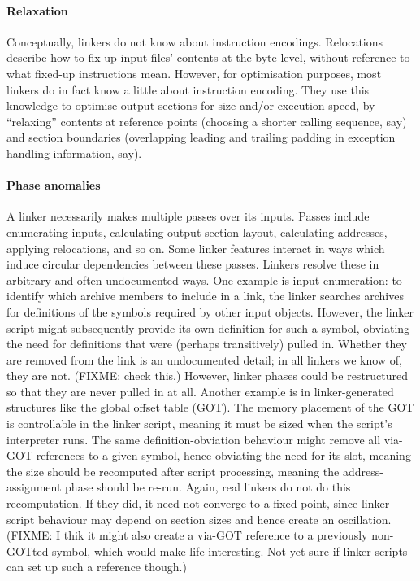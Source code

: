 \paragraph{Relaxation}
Conceptually, linkers do not know about instruction encodings.
Relocations describe how to fix up input files' contents at the byte level,
without reference to what fixed-up instructions mean.
However, for optimisation purposes, most linkers do in fact
know a little about instruction encoding.
They use this knowledge to optimise output sections
for size and/or execution speed, by ``relaxing'' contents
at reference points (choosing a shorter calling sequence, say) 
and section boundaries (overlapping leading and trailing padding in exception
handling information, say).

\paragraph{Phase anomalies} 
A linker necessarily makes multiple passes over its inputs.
Passes include enumerating inputs, calculating output section layout, 
calculating addresses, applying relocations, and so on.
Some linker features interact in ways which induce circular dependencies between
these passes. 
Linkers resolve these in arbitrary and often undocumented ways.
One example is input enumeration: to identify which archive members
to include in a link, the linker searches archives for definitions
of the symbols required by other input objects.
However, the linker script might subsequently provide its own definition
for such a symbol, obviating the need for definitions that were (perhaps transitively) pulled in.
Whether they are removed from the link is an undocumented detail; 
in all linkers we know of, they are not. (FIXME: check this.)
However, linker phases could be restructured so that they are never pulled in at all.
Another example is in linker-generated structures like the global offset table (GOT). 
The memory placement of the GOT is controllable in the linker script,
meaning it must be sized when the script's interpreter runs. 
The same definition-obviation behaviour might remove all via-GOT references
to a given symbol, hence obviating the need for its slot, meaning the size
should be recomputed after script processing, meaning the address-assignment phase
should be re-run. 
Again, real linkers do not do this recomputation.
If they did, it need not converge to a fixed point, since linker script behaviour
may depend on section sizes and hence create an oscillation.
(FIXME: I thik it might also create a via-GOT reference
to a previously non-GOTted symbol, which would make life interesting.
Not yet sure if linker scripts can set up such a reference though.)


